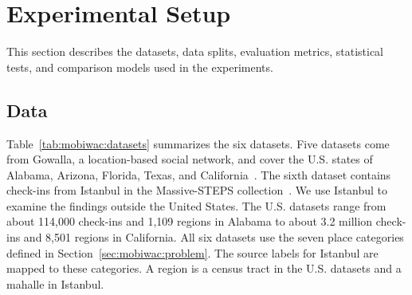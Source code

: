\section{Experimental Setup}
\label{sec:mobiwac:setup}

This section describes the datasets, data splits, evaluation metrics, statistical tests, and comparison models used in the experiments.

\subsection{Data}
\label{sec:mobiwac:setup-data}
Table~\ref{tab:mobiwac:datasets} summarizes the six datasets. Five datasets come from Gowalla, a location-based social network, and cover the U.S. states of Alabama, Arizona, Florida, Texas, and California~\cite{cho2011gowalla}. The sixth dataset contains check-ins from Istanbul in the Massive-STEPS collection~\cite{wongso2025massivesteps}. We use Istanbul to examine the findings outside the United States.
The U.S. datasets range from about 114,000 check-ins and 1,109 regions in Alabama to about 3.2 million check-ins and 8,501 regions in California. All six datasets use the seven place categories defined in Section~\ref{sec:mobiwac:problem}. The source labels for Istanbul are mapped to these categories. A region is a census tract in the U.S. datasets and a mahalle in Istanbul.


